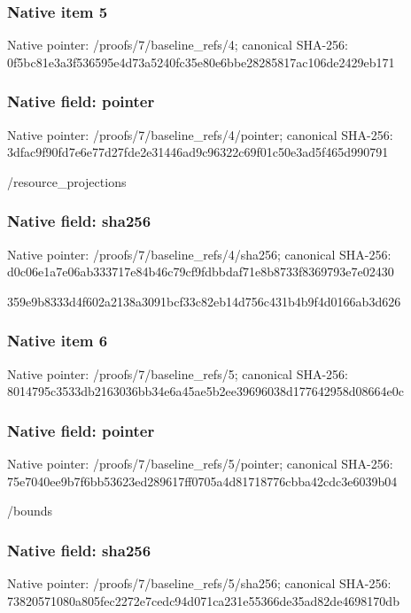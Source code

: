 \documentclass[10pt,a4paper]{article}
\begin{document}
\subsubsection{Native item 5}
Native pointer: /proofs/7/baseline\_\allowbreak{}refs/4; canonical SHA-256: 0f5bc81e3a3f536595e4d73a5240fc35e80e6bbe28285817ac106de2429eb171

\subsubsection{Native field: pointer}
Native pointer: /proofs/7/baseline\_\allowbreak{}refs/4/pointer; canonical SHA-256: 3dfac9f90fd7e6e77d27fde2e31446ad9c96322c69f01c50e3ad5f465d990791

\begingroup\raggedright\sloppy /\allowbreak{}resource\_\allowbreak{}projections\par\endgroup

\subsubsection{Native field: sha256}
Native pointer: /proofs/7/baseline\_\allowbreak{}refs/4/sha256; canonical SHA-256: d0c06e1a7e06ab333717e84b46c79cf9fdbbdaf71e8b8733f8369793e7e02430

\begingroup\raggedright\sloppy 359e9b8333d4f602a2138a3091bcf33c82eb14d756c431b4b9f4d0166ab3d626\par\endgroup

\subsubsection{Native item 6}
Native pointer: /proofs/7/baseline\_\allowbreak{}refs/5; canonical SHA-256: 8014795c3533db2163036bb34e6a45ae5b2ee39696038d177642958d08664e0c

\subsubsection{Native field: pointer}
Native pointer: /proofs/7/baseline\_\allowbreak{}refs/5/pointer; canonical SHA-256: 75e7040ee9b7f6bb53623ed289617ff0705a4d81718776cbba42cdc3e6039b04

\begingroup\raggedright\sloppy /\allowbreak{}bounds\par\endgroup

\subsubsection{Native field: sha256}
Native pointer: /proofs/7/baseline\_\allowbreak{}refs/5/sha256; canonical SHA-256: 73820571080a805fec2272e7cedc94d071ca231e55366de35ad82de4698170db
\end{document}

